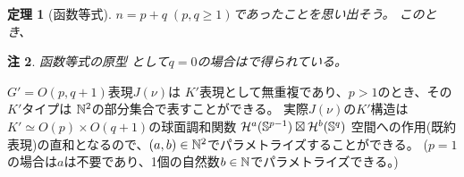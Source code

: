 \documentclass[12pt]{article} %
\newtheorem{theorem}{定理}
\newtheorem{remark}[theorem]{注}
\theoremstyle{definition}
\theoremstyle{exampstyle} \newtheorem{examp}[theorem]{Theorem}
\begin{document}
	\begin{theorem}[函数等式]
		$n=p+q\;(p,q\ge1)$で{あった}ことを思い出そう。
	このとき、
	
	\end{theorem}
	\begin{remark}
		函数等式の原型
		として$q=0$の場合は\cite[Thm. 12.6]{kobayashi2015program}で得られている。
	\end{remark}
	$G'=O(p,q+1)$表現$J(\nu)$は $K'$表現として無重複であり、$p>1$のとき、その$K'$タイプは $\mathbb{N}^2$の部分集合で表すことができる。
	実際$J(\nu)$の$K'$構造は$K'\simeq O(p)\times O(q+1)$の球面調和関数
	$\mathcal{H}^a(\mathbb{S}^{p-1})\boxtimes\mathcal{H}^b(\mathbb{S}^q)$
	空間への作用(既約表現)の直和となるので、$(a,b)\in\mathbb{N}^2$でパラメトライズすることができる。
	($p=1$の場合は$a$は不要であり、1個の自然数$b\in\mathbb{N}$でパラメトライズできる。)
\end{document}
